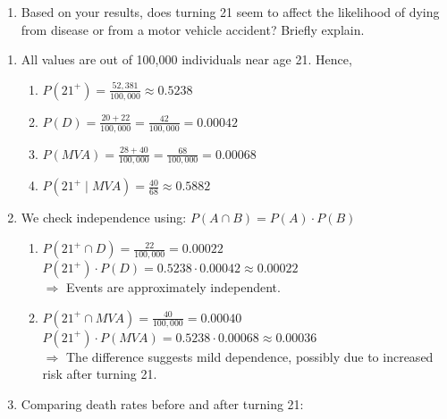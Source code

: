 \documentclass[11pt]{exam}
\begin{document}
\begin{questions}
\begin{enumerate}[label=(\alph*)]
    \item Based on your results, does turning 21 seem to affect the likelihood of dying from disease or from a motor vehicle accident? Briefly explain.
\end{enumerate}


\begin{solution}[0cm]

\begin{enumerate}[label=(\alph*)]
    \item All values are out of 100,000 individuals near age 21. Hence,

    \begin{enumerate}[label=(a.\roman*)]
        \item $P(21^+) = \frac{52{,}381}{100{,}000} \approx 0.5238$
        
        \item $P(D) = \frac{20 + 22}{100{,}000} = \frac{42}{100{,}000} = 0.00042$
        
        \item $P(MVA) = \frac{28 + 40}{100{,}000} = \frac{68}{100{,}000} = 0.00068$
        
        \item $P(21^+ \mid MVA) = \frac{40}{68} \approx 0.5882$
    \end{enumerate}

    \item We check independence using: $P(A \cap B) = P(A) \cdot P(B)$
    
    \begin{enumerate}[label=(b.\roman*)]
        \item $P(21^+ \cap D) = \frac{22}{100{,}000} = 0.00022$ \\
        $P(21^+) \cdot P(D) = 0.5238 \cdot 0.00042 \approx 0.00022$ \\
        $\Rightarrow$ Events are approximately independent.
        
        \item $P(21^+ \cap MVA) = \frac{40}{100{,}000} = 0.00040$ \\
        $P(21^+) \cdot P(MVA) = 0.5238 \cdot 0.00068 \approx 0.00036$ \\
        $\Rightarrow$ The difference suggests mild dependence, possibly due to increased risk after turning 21.
    \end{enumerate}

    \item Comparing death rates before and after turning 21:


\end{enumerate}
\end{solution}
\end{questions}
\end{document}

